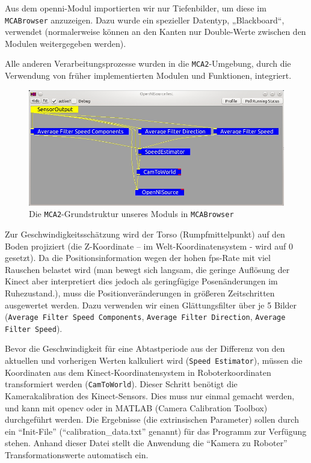 Aus dem \gls{openni}-Modul importierten wir nur Tiefenbilder, um diese im
\lstinline{MCABrowser} anzuzeigen. Dazu wurde ein spezieller Datentyp,
„Blackboard“, verwendet (normalerweise können an den Kanten nur Double-Werte zwischen den Modulen weitergegeben werden).

Alle anderen Verarbeitungsprozesse wurden in die \lstinline{MCA2}-Umgebung,
durch die Verwendung von früher implementierten Modulen und Funktionen, integriert.

\begin{figure}[h]
\center
\includegraphics[scale=0.5]{graphics/OpenNISourceTest.jpg}
\caption{\label{fig:OpenNISourceTest} Die \lstinline{MCA2}-Grundstruktur
unseres Moduls in \lstinline{MCABrowser}}
\end{figure}

Zur Geschwindigkeitsschätzung wird der Torso (Rumpfmittelpunkt) auf den Boden projiziert
 (die Z-Koordinate – im Welt-Koordinatensystem - wird auf 0 gesetzt). Da die
 Positionsinformation wegen der hohen \gls{fps}-Rate mit viel Rauschen belastet wird
 (man bewegt sich langsam, die geringe Auflösung der Kinect aber interpretiert
 dies jedoch als geringfügige Posenänderungen im Ruhezustand.), muss die Positionveränderungen
 in größeren Zeitschritten ausgewertet werden. Dazu verwenden wir einen Glättungsfilter über
 je 5 Bilder (\lstinline{Average Filter Speed Components}, \lstinline{Average Filter Direction}, \lstinline{Average Filter Speed}).
 
Bevor die Geschwindigkeit für eine Abtastperiode aus der Differenz von den
aktuellen und vorherigen Werten kalkuliert wird (\lstinline{Speed Estimator}),
müssen die Koordinaten aus dem Kinect-Koordinatensystem in Roboterkoordinaten transformiert werden
 (\lstinline{CamToWorld}). Dieser Schritt benötigt die Kamerakalibration des
 Kinect-Sensors. Dies muss nur einmal gemacht werden, und kann mit \gls{opencv} oder
 in MATLAB (Camera Calibration Toolbox) durchgeführt werden. Die Ergebnisse (die extrinsischen Parameter)
 sollen durch ein ``Init-File'' (``calibration\_data.txt'' genannt) für das
 Programm zur Verfügung stehen.
 Anhand dieser Datei stellt die Anwendung die ``Kamera zu Roboter'' Transformationswerte automatisch ein.
 
